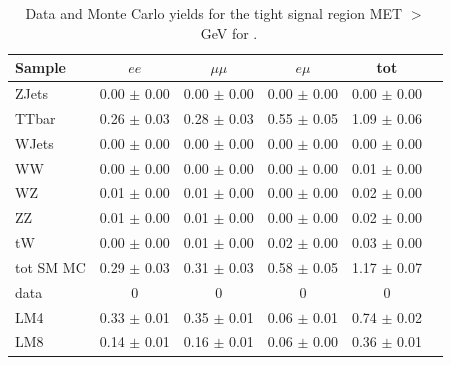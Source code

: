 \begin{table}[htb]
\begin{center}
\caption{\label{sigyieldtabletight} Data and Monte Carlo yields for the tight signal region MET $>$ \signalmett~GeV  for \lumi.}
\begin{tabular}{lccccc}
\hline
              Sample   &                $ee$   &            $\mu\mu$   &              $e\mu$   &                 tot  \\
\hline
               ZJets   &     0.00 $\pm$ 0.00   &     0.00 $\pm$ 0.00   &     0.00 $\pm$ 0.00   &     0.00 $\pm$ 0.00  \\
               TTbar   &     0.26 $\pm$ 0.03   &     0.28 $\pm$ 0.03   &     0.55 $\pm$ 0.05   &     1.09 $\pm$ 0.06  \\
               WJets   &     0.00 $\pm$ 0.00   &     0.00 $\pm$ 0.00   &     0.00 $\pm$ 0.00   &     0.00 $\pm$ 0.00  \\
                  WW   &     0.00 $\pm$ 0.00   &     0.00 $\pm$ 0.00   &     0.00 $\pm$ 0.00   &     0.01 $\pm$ 0.00  \\
                  WZ   &     0.01 $\pm$ 0.00   &     0.01 $\pm$ 0.00   &     0.00 $\pm$ 0.00   &     0.02 $\pm$ 0.00  \\
                  ZZ   &     0.01 $\pm$ 0.00   &     0.01 $\pm$ 0.00   &     0.00 $\pm$ 0.00   &     0.02 $\pm$ 0.00  \\
                  tW   &     0.00 $\pm$ 0.00   &     0.01 $\pm$ 0.00   &     0.02 $\pm$ 0.00   &     0.03 $\pm$ 0.00  \\
\hline
           tot SM MC   &     0.29 $\pm$ 0.03   &     0.31 $\pm$ 0.03   &     0.58 $\pm$ 0.05   &     1.17 $\pm$ 0.07  \\
\hline
                data   &                   0   &                   0   &                   0   &                   0  \\
\hline
                 LM4   &     0.33 $\pm$ 0.01   &     0.35 $\pm$ 0.01   &     0.06 $\pm$ 0.01   &     0.74 $\pm$ 0.02  \\
                 LM8   &     0.14 $\pm$ 0.01   &     0.16 $\pm$ 0.01   &     0.06 $\pm$ 0.00   &     0.36 $\pm$ 0.01  \\
\hline
\end{tabular}
\end{center}
\end{table}

